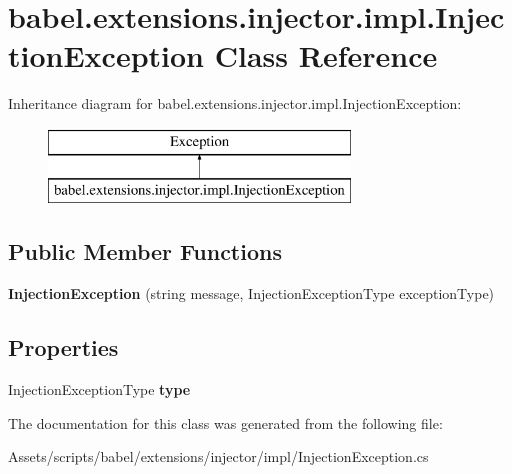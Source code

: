 \hypertarget{classbabel_1_1extensions_1_1injector_1_1impl_1_1_injection_exception}{\section{babel.\-extensions.\-injector.\-impl.\-Injection\-Exception Class Reference}
\label{classbabel_1_1extensions_1_1injector_1_1impl_1_1_injection_exception}
}
Inheritance diagram for babel.\-extensions.\-injector.\-impl.\-Injection\-Exception\-:\begin{figure}[H]
\begin{center}
\leavevmode
\includegraphics[height=2.000000cm]{classbabel_1_1extensions_1_1injector_1_1impl_1_1_injection_exception}
\end{center}
\end{figure}
\subsection*{Public Member Functions}
\begin{DoxyCompactItemize}
\item 
\hypertarget{classbabel_1_1extensions_1_1injector_1_1impl_1_1_injection_exception_a8391c83a503b3744d6e4465dc86ebb7f}{{\bfseries Injection\-Exception} (string message, Injection\-Exception\-Type exception\-Type)}\label{classbabel_1_1extensions_1_1injector_1_1impl_1_1_injection_exception_a8391c83a503b3744d6e4465dc86ebb7f}

\end{DoxyCompactItemize}
\subsection*{Properties}
\begin{DoxyCompactItemize}
\item 
\hypertarget{classbabel_1_1extensions_1_1injector_1_1impl_1_1_injection_exception_ae778dad0d8875ae976b155f97f472050}{Injection\-Exception\-Type {\bfseries type}}\label{classbabel_1_1extensions_1_1injector_1_1impl_1_1_injection_exception_ae778dad0d8875ae976b155f97f472050}

\end{DoxyCompactItemize}


The documentation for this class was generated from the following file\-:\begin{DoxyCompactItemize}
\item 
Assets/scripts/babel/extensions/injector/impl/Injection\-Exception.\-cs\end{DoxyCompactItemize}
